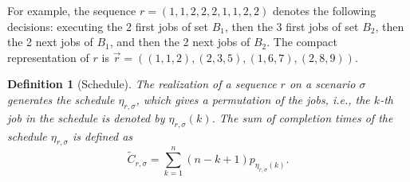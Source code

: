 \documentclass{article}
\newtheorem{definition}{Definition}
\begin{document}
For example, the sequence \(r=(1,1,2,2,2,1,1,2,2)\) denotes the following decisions: executing the 2 first jobs of set \(B_1\), then the 3 first jobs of set \(B_2\), then the 2 next jobs of \(B_1\), and then the 2 next jobs of \(B_2\).
The compact representation of \(r\) is \(\overrightarrow{r}=((1,1,2),(2,3,5),(1,6,7),(2,8,9))\).

\begin{definition}[Schedule]
    The realization of a sequence \(r\) on a scenario \(\sigma\) generates the schedule \(\eta_{r,\sigma}\), which gives a permutation of the jobs, i.e., the \(k\)-th job in the schedule is denoted by \(\eta_{r,\sigma}(k)\).
    The sum of completion times of the schedule \(\eta_{r,\sigma}\) is defined as
    \[
        \tilde{C}_{r,\sigma}=\sum_{k=1}^n (n-k+1)p_{\eta_{r,\sigma}(k)}.
    \]
\end{definition}



\end{document}
